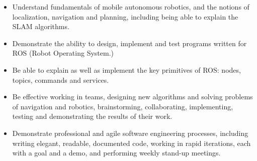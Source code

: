 \begin{itemize}
\item Understand fundamentals of mobile autonomous robotics, and the notions of localization, navigation and planning, including being able to explain the SLAM algorithms.
\item Demonstrate the ability to design, implement and test programs written for ROS (Robot Operating System.) 
\item Be able to explain as well as implement the key primitives of ROS: nodes, topics, commands and services.
\item Be effective working in teams, designing new algorithms and solving problems of navigation and robotics, brainstorming, collaborating, implementing, testing and demonstrating the results of their work.
\item Demonstrate professional and agile software engineering processes, including writing elegant, readable, documented code, working in rapid iterations, each with a goal and a demo, and performing weekly stand-up\cite{standup} meetings.
\end{itemize}
